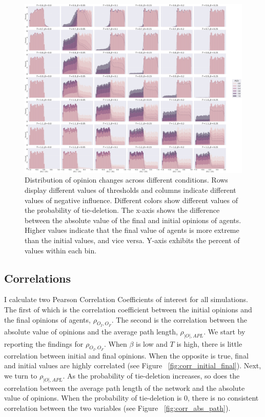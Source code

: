 \documentclass{article}
\begin{document}
\begin{figure}[H]
    \centering
    \includegraphics[width=.9\linewidth]{../plots/overall/Radicalization.png}
  \caption{Distribution of opinion changes across different conditions. Rows display different values of thresholds and columns indicate different values of negative influence. Different colors show different values of the probability of tie-deletion. The x-axis shows the difference between the absolute value of the final and initial opinions of agents. Higher values indicate that the final value of agents is more extreme than the initial values, and vice versa. Y-axis exhibits the percent of values within each bin. }
  \label{fig:radicalization}
\end{figure}

\subsection{Correlations}

I calculate two Pearson Correlation Coefficients of interest for all simulations. The first of which is the correlation coefficient between the initial opinions and the final opinions of agents, $\rho_{O_I, O_F}$. The second is the correlation between the absolute value of opinions and the average path length, $\rho_{|O|, APL}$.
We start by reporting the findings for $\rho_{O_I, O_F}$. When $\beta$ is low and $T$ is high, there is little correlation between initial and final opinions. When the opposite is true, final and initial values are highly correlated (see Figure ~\ref{fig:corr_initial_final}). 
Next, we turn to $\rho_{|O|, APL}$. As the probability of tie-deletion increases, so does the correlation between the average path length of the network and the absolute value of opinions. When the probability of tie-deletion is 0, there is no consistent correlation between the two variables (see Figure ~\ref{fig:corr_abs_path}). 
\end{document}
